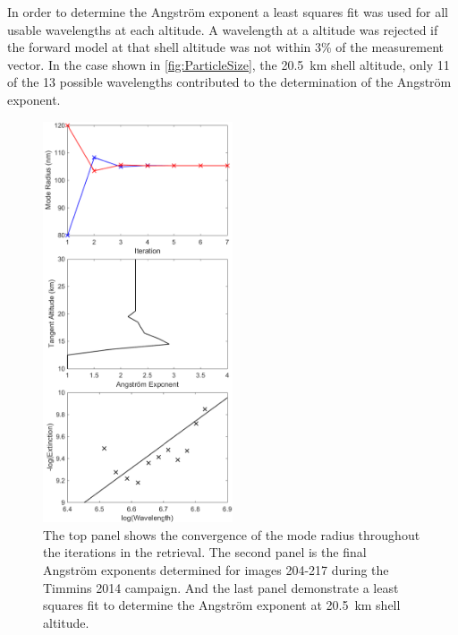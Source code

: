 In order to determine the Angstr\"{o}m exponent a least squares fit was used for all usable wavelengths at each altitude. A wavelength at a altitude was rejected if the forward model at that shell altitude was not within 3\% of the measurement vector. In the case shown in \autoref{fig:ParticleSize}, the 20.5~km shell altitude, only 11 of the 13 possible wavelengths contributed to the determination of the Angstr\"{o}m exponent.

\begin{figure}
\centering
\includegraphics[width=0.5\textwidth]{./Images/5-4-ParticleSize.pdf}
    \caption[TODO:Write This]{The top panel shows the convergence of the mode radius throughout the iterations in the retrieval. The second panel is the final Angstr\"{o}m exponents determined for images 204-217 during the Timmins 2014 campaign. And the last panel demonstrate a least squares fit to determine the Angstr\"{o}m exponent at 20.5~km shell altitude.}
    \label{fig:5.4:ParticleSize}
\end{figure} 